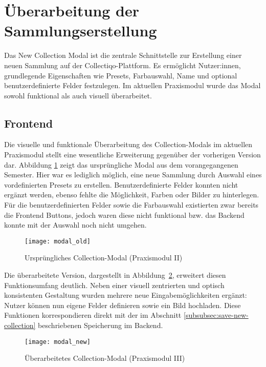 \section{Überarbeitung der Sammlungserstellung}\label{sec:uberarbeitung-der-sammlungserstellung}

Das New Collection Modal ist die zentrale Schnittstelle zur Erstellung einer neuen Sammlung auf der Collectiqo-Plattform.
Es ermöglicht Nutzer:innen, grundlegende Eigenschaften wie Presets, Farbauswahl, Name und optional benutzerdefinierte Felder festzulegen.
Im aktuellen Praxismodul wurde das Modal sowohl funktional als auch visuell überarbeitet.

%
\subsection{Frontend}\label{subsec:new-collection-frontend}

Die visuelle und funktionale Überarbeitung des Collection-Modals im aktuellen Praxismodul stellt eine wesentliche Erweiterung gegenüber der vorherigen Version dar.
Abbildung \ref{fig:modal-old} zeigt das ursprüngliche Modal aus dem vorangegangenen Semester.
Hier war es lediglich möglich, eine neue Sammlung durch Auswahl eines vordefinierten Presets zu erstellen.
Benutzerdefinierte Felder konnten nicht ergänzt werden, ebenso fehlte die Möglichkeit, Farben oder Bilder zu hinterlegen.
Für die benutzerdefinierten Felder sowie die Farbauswahl existierten zwar bereits die Frontend Buttons, jedoch waren diese nicht funktional bzw. das Backend konnte mit der Auswahl noch nicht umgehen.

\begin{figure}[H]
    \centering
    \texttt{[image: modal\_old]}
    \caption{Ursprüngliches Collection-Modal (Praxismodul II)}
    \label{fig:modal-old}
\end{figure}

Die überarbeitete Version, dargestellt in Abbildung~\ref{fig:modal-new}, erweitert diesen Funktionsumfang deutlich.
Neben einer visuell zentrierten und optisch konsistenten Gestaltung wurden mehrere neue Eingabemöglichkeiten ergänzt: Nutzer können nun eigene Felder definieren sowie ein Bild hochladen.
Diese Funktionen korrespondieren direkt mit der im Abschnitt \ref{subsubsec:save-new-collection} beschriebenen Speicherung im Backend.

\begin{figure}[H]
    \centering
    \texttt{[image: modal\_new]}
    \caption{Überarbeitetes Collection-Modal (Praxismodul III)}
    \label{fig:modal-new}
\end{figure}

